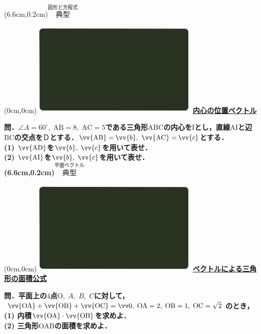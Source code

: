 \documentclass[10pt,
fleqn,
dvipdfmx,
uplatex
]{jsarticle}
\begin{document}
\at(6.6cm,0.2cm){\small\color{bradorange}$\overset{\text{図形と方程式}}{\text{典型}}$}

\newpage



\at(0cm,0cm){\includegraphics[width=8cm,bb=0 0 1920 1080]{./youtube/thumbnails/templates/smart_background/平面ベクトル.jpeg}}
{\color{orange}\bf\boldmath\LARGE\underline{内心の位置ベクトル}}\vspace{0.3zw}

\normalsize 
\bf\boldmath 問．$\angle A={60}^\circ ,\;\text{AB}=8,\;\text{AC}=5$である三角形$\text{ABC}$の内心を$\text{I}$とし，直線$\text{AI}$と辺$\text{BC}$の交点を$Ｄ$とする．$\vv{\text{AB}} =$$\vv{b},\;$$\vv{\text{AC}} =$$\vv{c}$とする．\\
(1) $\vv{\text{AD}}$を$\vv{b},\;$$\vv{c}$を用いて表せ．\\
(2) $\vv{\text{AI}}$を$\vv{b},\;$$\vv{c}$を用いて表せ．\\

\at(6.6cm,0.2cm){\small\color{bradorange}$\overset{\text{平面ベクトル}}{\text{典型}}$}


\newpage



\at(0cm,0cm){\includegraphics[width=8cm,bb=0 0 1920 1080]{./youtube/thumbnails/templates/smart_background/平面ベクトル.jpeg}}
{\color{orange}\bf\boldmath\large\underline{ベクトルによる三角形の面積公式}}\vspace{0.3zw}

\large 
\bf\boldmath 問．平面上の$4$点$\text{O},\;A,\;B,\;C$に対して，$\vv {\text{OA}}+\vv {\text{OB}}+\vv {\text{OC}}=\vv 0,\;\text{OA}=2,\;\text{OB}=1,\;\text{OC}=\sqrt 2$のとき，\\
(1)  内積$\vv {\text{OA}}\cdot \vv {\text{OB}}$を求めよ．\\
(2)  三角形$\text{OAB}$の面積を求めよ．\\
\end{document}
